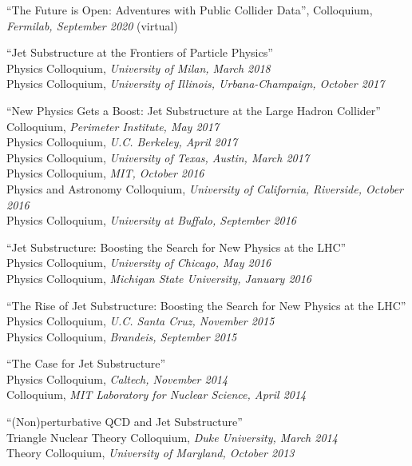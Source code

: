 \item ``The Future is Open:  Adventures with Public Collider Data'', Colloquium, \emph{Fermilab, September 2020} (virtual)

\item ``Jet Substructure at the Frontiers of Particle Physics''
\\ Physics Colloquium, \emph{University of Milan, March 2018}
\\ Physics Colloquium, \emph{University of Illinois, Urbana-Champaign, October 2017}

\item ``New Physics Gets a Boost:  Jet Substructure at the Large Hadron Collider''
\\ Colloquium, \emph{Perimeter Institute, May 2017}
\\ Physics Colloquium, \emph{U.C. Berkeley, April 2017}
\\ Physics Colloquium, \emph{University of Texas, Austin, March 2017}
\\ Physics Colloquium, \emph{MIT, October 2016}
\\ Physics and Astronomy Colloquium, \emph{University of California, Riverside, October 2016}
\\ Physics Colloquium, \emph{University at Buffalo, September 2016}

\item ``Jet Substructure:  Boosting the Search for New Physics at the LHC''
\\ Physics Colloquium, \emph{University of Chicago, May 2016}
\\ Physics Colloquium, \emph{Michigan State University, January 2016}

\item ``The Rise of Jet Substructure:  Boosting the Search for New Physics at the LHC''
\\ Physics Colloquium, \emph{U.C. Santa Cruz, November 2015}
\\ Physics Colloquium, \emph{Brandeis, September 2015}

\item ``The Case for Jet Substructure''
\\ Physics Colloquium, \emph{Caltech, November 2014}
\\ Colloquium, \emph{MIT Laboratory for Nuclear Science, April 2014}

\item ``(Non)perturbative QCD and Jet Substructure''
\\ Triangle Nuclear Theory Colloquium, \emph{Duke University, March 2014}
\\ Theory Colloquium, \emph{University of Maryland, October 2013}

